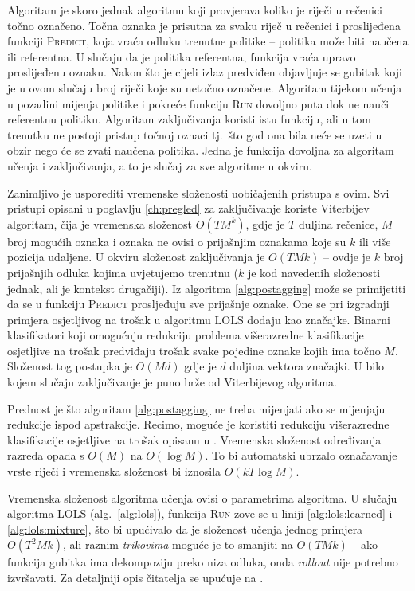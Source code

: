 Algoritam je skoro jednak algoritmu koji provjerava koliko je riječi u rečenici
točno označeno. Točna oznaka je prisutna za svaku riječ u rečenici i proslijeđena
funkciji \textsc{Predict}, koja vraća odluku trenutne politike -- politika može biti
naučena ili referentna. U slučaju da je politika referentna, funkcija vraća upravo
proslijeđenu oznaku. Nakon što je cijeli izlaz predviđen objavljuje se gubitak
koji je u ovom slučaju broj riječi koje su netočno označene. Algoritam tijekom
učenja u pozadini mijenja politike i pokreće funkciju \textsc{Run} dovoljno puta
dok ne nauči referentnu politiku. Algoritam zaključivanja koristi istu funkciju,
ali u tom trenutku ne postoji pristup točnoj oznaci tj.~što god ona bila neće se
uzeti u obzir nego će se zvati naučena politika. Jedna je funkcija dovoljna za
algoritam učenja i zaključivanja, a to je slučaj za sve algoritme u \lts{}
okviru.

Zanimljivo je usporediti vremenske složenosti uobičajenih pristupa s ovim. Svi
pristupi opisani u poglavlju \ref{ch:pregled} za zaključivanje koriste
Viterbijev algoritam, čija je vremenska složenost $O(T M ^ k)$, gdje je $T$
duljina rečenice, $M$ broj mogućih oznaka i oznaka ne ovisi o prijašnjim
oznakama koje su $k$ ili više pozicija udaljene. U \lts{} okviru složenost
zaključivanja je $O(T M k)$ -- ovdje je $k$ broj prijašnjih odluka kojima
uvjetujemo trenutnu ($k$ je kod navedenih složenosti jednak, ali je kontekst
drugačiji). Iz algoritma \ref{alg:postagging} može se primijetiti da se u
funkciju \textsc{Predict} prosljeđuju sve prijašnje oznake. One se pri izgradnji
primjera osjetljivog na trošak u algoritmu \textsc{LOLS} dodaju kao značajke.
Binarni klasifikatori koji omogućuju redukciju problema višerazredne
klasifikacije osjetljive na trošak predviđaju trošak svake pojedine oznake kojih
ima točno $M$. Složenost tog postupka je $O(M d)$ gdje je $d$ duljina vektora
značajki. U bilo kojem slučaju zaključivanje je puno brže od Viterbijevog
algoritma.

Prednost je što algoritam \ref{alg:postagging} ne treba mijenjati ako se
mijenjaju redukcije ispod apstrakcije. Recimo, moguće je koristiti redukciju
višerazredne klasifikacije osjetljive na trošak opisanu u
\citep{beygelzimer2009error, daume2016one}. Vremenska složenost određivanja
razreda opada s $O(M)$ na $O(\log M)$. To bi automatski ubrzalo označavanje
vrste riječi i vremenska složenost bi iznosila $O(k T \log M)$.

Vremenska složenost algoritma učenja ovisi o parametrima algoritma. U slučaju
algoritma \textsc{LOLS} (alg.~\ref{alg:lols}), funkcija \textsc{Run} zove se u
liniji \ref{alg:lols:learned} i \ref{alg:lols:mixture}, što bi upućivalo da je
složenost učenja jednog primjera $O(T ^ 2 M k)$, ali raznim \textit{trikovima}
moguće je to smanjiti na $O(T M k)$ -- ako funkcija gubitka ima dekompoziju
preko niza odluka, onda \textit{rollout} nije potrebno izvršavati. Za detaljniji
opis čitatelja se upućuje na \citep{daume14lts}.


